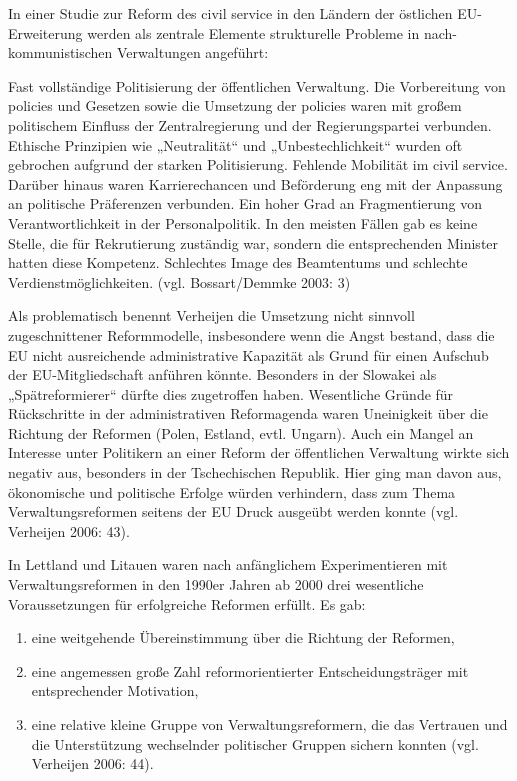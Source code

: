 In einer Studie zur Reform des civil service in den Ländern der östlichen EU-Erweiterung werden als zentrale Elemente strukturelle Probleme in nach-kommunistischen Verwaltungen angeführt: 

Fast vollständige Politisierung der öffentlichen Verwaltung. Die Vorbereitung von policies und Gesetzen sowie die Umsetzung der policies waren mit großem politischem Einfluss der Zentralregierung und der Regierungspartei verbunden. 
Ethische Prinzipien wie „Neutralität“ und „Unbestechlichkeit“ wurden oft gebrochen aufgrund der starken Politisierung.
Fehlende Mobilität im civil service. Darüber hinaus waren Karrierechancen und Beförderung eng mit der Anpassung an politische Präferenzen verbunden.
Ein hoher Grad an Fragmentierung von Verantwortlichkeit in der Personalpolitik. 
In den meisten Fällen gab es keine Stelle, die für Rekrutierung zuständig war, sondern die entsprechenden Minister hatten diese Kompetenz.
Schlechtes Image des Beamtentums und schlechte Verdienstmöglichkeiten.
(vgl. Bossart/Demmke 2003: 3) \par

Als problematisch benennt Verheijen die Umsetzung nicht sinnvoll zugeschnittener Reformmodelle, insbesondere wenn die Angst bestand, dass die EU nicht ausreichende administrative Kapazität als Grund für einen Aufschub der EU-Mitgliedschaft anführen könnte. Besonders in der Slowakei als „Spätreformierer“ dürfte dies zugetroffen haben. Wesentliche Gründe für Rückschritte in der administrativen Reformagenda waren Uneinigkeit über die Richtung der Reformen (Polen, Estland, evtl. Ungarn). Auch ein Mangel an Interesse unter Politikern an einer Reform der öffentlichen Verwaltung wirkte sich negativ aus, besonders in der Tschechischen Republik. Hier ging man davon aus, ökonomische und politische Erfolge würden verhindern, dass zum Thema Verwaltungsreformen seitens der EU Druck ausgeübt werden konnte (vgl. Verheijen 2006: 43). \par

In Lettland und Litauen waren nach anfänglichem Experimentieren mit Verwaltungsreformen in den 1990er Jahren ab 2000 drei wesentliche Voraussetzungen für erfolgreiche Reformen erfüllt. Es gab:
\begin{enumerate}
\item  eine weitgehende Übereinstimmung über die Richtung der Reformen,
\item eine angemessen große Zahl reformorientierter Entscheidungsträger mit entsprechender Motivation, 
\item eine relative kleine Gruppe von Verwaltungsreformern, die das Vertrauen und die Unterstützung wechselnder politischer Gruppen sichern konnten (vgl. Verheijen 2006: 44).
\end{enumerate}

